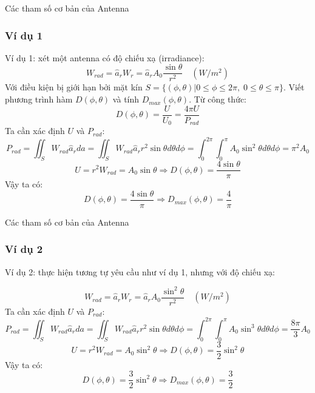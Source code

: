 \documentclass[8pt]{beamer}
\begin{document}
\begin{frame}{Các tham số cơ bản của Antenna}
\subsubsection{Ví dụ 1}
Ví dụ 1: xét một antenna có độ chiếu xạ (irradiance):
$$W_{rad}=\hat a_{r}W_{r}=\hat a_{r}A_{0}\frac{\sin{\theta}}{r^2}\quad(W/m^2)$$
Với điều kiện bị giới hạn bởi mặt kín $S=\{(\phi,\theta)|0\leq\phi\leq2\pi,\;0\leq\theta\leq\pi\}$. Viết phương trình hàm $D(\phi,\theta)$ và tính $D_{max}(\phi,\theta)$.
Từ công thức: $$D(\phi,\theta)=\frac{U}{U_{0}}=\frac{4\pi U}{P_{rad}}$$
Ta cần xác định $U$ và $P_{rad}$:
$$P_{rad}=\iint_{S}W_{rad}\hat a_{r}da=\iint_{S}W_{rad}\hat a_{r}r^2\sin{\theta}d\theta d\phi=\int_{0}^{2\pi}\int_{0}^{\pi}A_{0}\sin^2{\theta}d\theta d\phi=\pi^2A_{0}$$
$$U=r^2W_{rad}=A_{0}\sin{\theta}\Rightarrow D(\phi,\theta)=\frac{4\sin{\theta}}{\pi}$$
Vậy ta có:
$$D(\phi,\theta)=\frac{4\sin{\theta}}{\pi}\Rightarrow D_{max}(\phi,\theta)=\frac{4}{\pi}$$

\end{frame}
\begin{frame}{Các tham số cơ bản của Antenna}
\subsubsection{Ví dụ 2}
Ví dụ 2: thực hiện tương tự yêu cầu như ví dụ 1, nhưng với độ chiếu xạ:

$$W_{rad}=\hat a_{r}W_{r}=\hat a_{r}A_{0}\frac{\sin^2{\theta}}{r^2}\quad(W/m^2)$$
Ta cần xác định $U$ và $P_{rad}$:
$$P_{rad}=\iint_{S}W_{rad}\hat a_{r}da=\iint_{S}W_{rad}\hat a_{r}r^2\sin{\theta}d\theta d\phi=\int_{0}^{2\pi}\int_{0}^{\pi}A_{0}\sin^3{\theta}d\theta d\phi=\frac{8\pi}{3}A_{0}$$
$$U=r^2W_{rad}=A_{0}\sin^2{\theta}\Rightarrow D(\phi,\theta)=\frac{3}{2}\sin^2{\theta}$$
Vậy ta có:
$$D(\phi,\theta)=\frac{3}{2}\sin^2{\theta}\Rightarrow D_{max}(\phi,\theta)=\frac{3}{2}$$
\end{frame}
\end{document}
